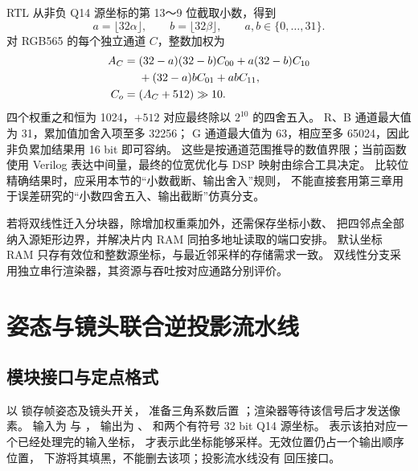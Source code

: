 RTL 从非负 Q14 源坐标的第 13～9 位截取小数，得到
\begin{equation}
 a=\lfloor32\alpha\rfloor,\qquad b=\lfloor32\beta\rfloor,
 \qquad a,b\in\{0,\ldots,31\}.
\end{equation}
对 RGB565 的每个独立通道 $C$，整数加权为
\begin{align}
 A_C={}&(32-a)(32-b)C_{00}+a(32-b)C_{10}\notag\\
 &+(32-a)bC_{01}+abC_{11},\notag\\
 C_o={}&(A_C+512)\gg10.
 \label{eq:fpga-bilinear-integer}
\end{align}
四个权重之和恒为 1024，$+512$ 对应最终除以 $2^{10}$ 的四舍五入。
R、B 通道最大值为 31，累加值加舍入项至多 32256；
G 通道最大值为 63，相应至多 65024，因此非负累加结果用 16 bit 即可容纳。
这些是按通道范围推导的数值界限；当前函数使用 Verilog 
表达中间量，最终的位宽优化与 DSP 映射由综合工具决定。
比较位精确结果时，应采用本节的“小数截断、输出舍入”规则，
不能直接套用第三章用于误差研究的“小数四舍五入、输出截断”仿真分支。

若将双线性迁入分块器，除增加权重乘加外，还需保存坐标小数、
把四邻点全部纳入源矩形边界，并解决片内 RAM 同拍多地址读取的端口安排。
默认坐标 RAM 只存有效位和整数源坐标，与最近邻采样的存储需求一致。
双线性分支采用独立串行渲染器，其资源与吞吐按对应通路分别评价。

\section{姿态与镜头联合逆投影流水线}
\subsection{模块接口与定点格式}
 以  锁存帧姿态及镜头开关，
准备三角系数后置 ；渲染器等待该信号后才发送像素。
输入为  与 ，
输出为 、 和两个有符号 32 bit Q14 源坐标。
 表示该拍对应一个已经处理完的输入坐标，
 才表示此坐标能够采样。无效位置仍占一个输出顺序位置，
下游将其填黑，不能删去该项；投影流水线没有  回压接口。

